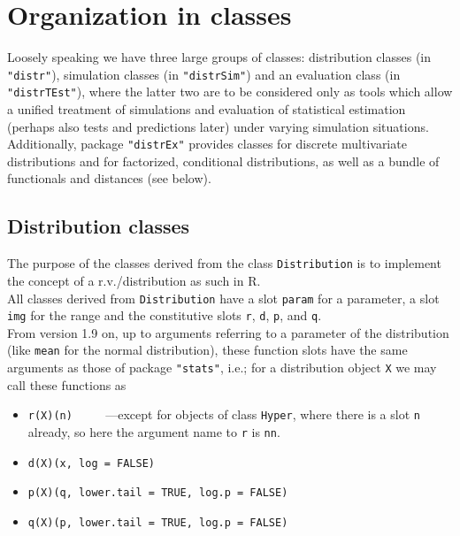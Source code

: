 \documentclass[11pt]{article}
\newcommand{\code}[1]{{\tt #1}}
\newcommand{\pkg}[1]{{\tt "#1"}}
\begin{document}
\section{Organization in classes}
Loosely speaking we have three large groups of classes: distribution classes (in
\pkg{distr}), simulation classes (in \pkg{distrSim}) and an evaluation class (in
\pkg{distrTEst}), where the latter two are to be considered only as tools which
allow a unified treatment of simulations and evaluation of statistical estimation
(perhaps also tests and predictions later) under varying simulation situations.
Additionally, package \pkg{distrEx} provides classes for discrete multivariate
distributions and for factorized, conditional distributions, as well as a bundle
of functionals and distances (see below).
\subsection{Distribution classes}
The purpose of the classes derived from the class \code{Distribution}  is to
implement the concept of a r.v./distribution as such in {\sf R}.\\
All classes derived from \code{Distribution} have a slot \code{param} for a
parameter, a slot \code{img} for the range and the constitutive slots \code{r},
\code{d}, \code{p}, and \code{q}.\\
From version 1.9 on, up to arguments referring to a parameter of the
distribution (like \code{mean} for the normal distribution), these function
slots have the same arguments as those of package \pkg{stats}, i.e.; for a
distribution object \code{X} we may call these functions as

\begin{itemize}
\item \code{r(X)(n)}  $\qquad$ ---except for objects of class \code{Hyper},
where there is a slot \code{n} already, so here the argument name
to \code{r} is \code{nn}.
\item \code{d(X)(x, log = FALSE)}
\item \code{p(X)(q, lower.tail = TRUE, log.p = FALSE)}
\item \code{q(X)(p, lower.tail = TRUE, log.p = FALSE)}
\end{itemize}
\end{document}
